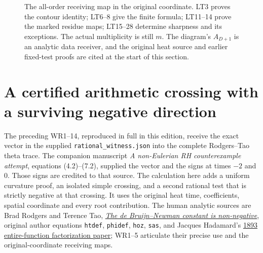 \begin{figure}[p]
\centering
{}
\caption{The all-order receiving map in the original coordinate.
LT3 proves the contour identity; LT6--8 give the finite formula;
LT11--14 prove the marked residue maps; LT15--28 determine
sharpness and its exceptions. The actual multiplicity is still $m$.
The diagram's $A_{D+1}$ is an analytic data receiver, and the
original heat source and earlier fixed-test proofs are cited at
the start of this section.}
\end{figure}

\clearpage
\section{A certified arithmetic crossing with a surviving negative direction}
\label{sec:native-crossing}

The preceding WR1--14, reproduced in full in this edition, receive the
exact vector in the supplied \texttt{rational\_witness.json} into the
complete Rodgers--Tao theta trace. The companion manuscript
\emph{A non-Eulerian RH counterexample attempt}, equations (4.2)--(7.2),
supplied the vector and the signs at times $-2$ and $0$. Those signs
are credited to that source. The calculation here adds a uniform
curvature proof, an isolated simple crossing, and a second rational
test that is strictly negative at that crossing. It uses the original
heat time, coefficients, spatial coordinate and every root contribution.
The human analytic sources are Brad Rodgers and Terence Tao,
\href{https://arxiv.org/abs/1801.05914v5}{\emph{The de Bruijn--Newman
constant is non-negative}}, original author equations
\texttt{htdef}, \texttt{phidef}, \texttt{hoz}, \texttt{sas}, and
Jacques Hadamard's
\href{https://www.numdam.org/item/JMPA_1893_4_9__171_0/}{1893
entire-function factorization paper}; WR1--5 articulate their precise
use and the original-coordinate receiving maps.

